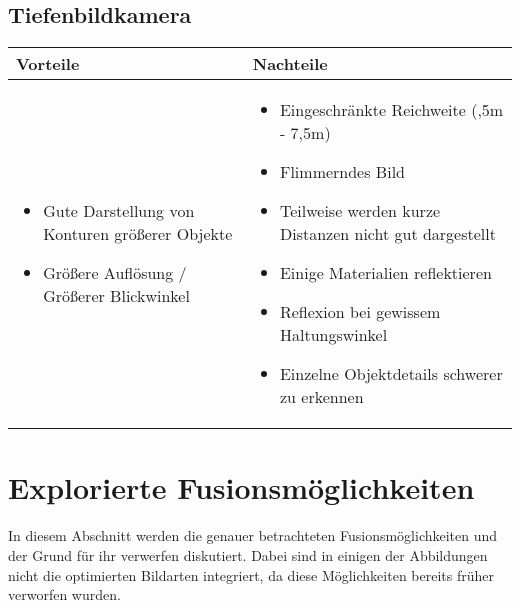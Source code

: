 \subsection{Tiefenbildkamera}
\begin{center}
	\begin{tabular}{| p{7.5cm} | p{7.5cm} |}
		\hline
		Vorteile & Nachteile \\ \hline
		
		\begin{itemize}
			\item Gute Darstellung von Konturen größerer Objekte
			\item Größere Auflösung / Größerer Blickwinkel
		\end{itemize} & \begin{itemize}
			\item Eingeschränkte Reichweite (\ca 0,5m - 7,5m)
			\item Flimmerndes Bild
			\item Teilweise werden kurze Distanzen nicht gut dargestellt
			\item Einige Materialien reflektieren
			\item Reflexion bei gewissem Haltungswinkel
			\item Einzelne Objektdetails schwerer zu erkennen
		\end{itemize} \\ 
		\hline
	\end{tabular}
\end{center}

\section{Explorierte Fusionsmöglichkeiten}
In diesem Abschnitt werden die genauer betrachteten Fusionsmöglichkeiten und der Grund für ihr verwerfen diskutiert.
Dabei sind in einigen der Abbildungen nicht die optimierten Bildarten integriert, da diese Möglichkeiten bereits früher verworfen wurden.

